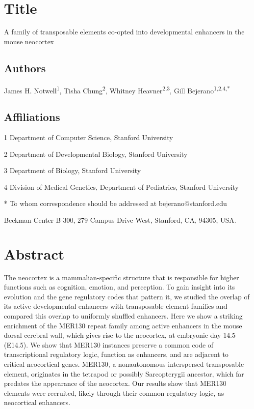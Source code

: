 \documentclass[]{article}
\date{}
\begin{document}
\section{Title}\label{title}

A family of transposable elements co-opted into developmental enhancers
in the mouse neocortex

\subsection{Authors}\label{authors}

James H. Notwell\textsuperscript{1}, Tisha Chung\textsuperscript{2},
Whitney Heavner\textsuperscript{2,3}, Gill
Bejerano\textsuperscript{1,2,4,*}

\subsection{Affiliations}\label{affiliations}

1 Department of Computer Science, Stanford University

2 Department of Developmental Biology, Stanford University

3 Department of Biology, Stanford University

4 Division of Medical Genetics, Department of Pediatrics, Stanford
University

* To whom correspondence should be addressed at bejerano@stanford.edu

Beckman Center B-300, 279 Campus Drive West, Stanford, CA, 94305, USA.

\section{Abstract}\label{abstract}

The neocortex is a mammalian-specific structure that is responsible for
higher functions such as cognition, emotion, and perception. To gain
insight into its evolution and the gene regulatory codes that pattern
it, we studied the overlap of its active developmental enhancers with
transposable element families and compared this overlap to uniformly
shuffled enhancers. Here we show a striking enrichment of the MER130
repeat family among active enhancers in the mouse dorsal cerebral wall,
which gives rise to the neocortex, at embryonic day 14.5 (E14.5). We
show that MER130 instances preserve a common code of transcriptional
regulatory logic, function as enhancers, and are adjacent to critical
neocortical genes. MER130, a nonautonomous interspersed transposable
element, originates in the tetrapod or possibly Sarcopterygii ancestor,
which far predates the appearance of the neocortex. Our results show
that MER130 elements were recruited, likely through their common
regulatory logic, as neocortical enhancers.
\end{document}
